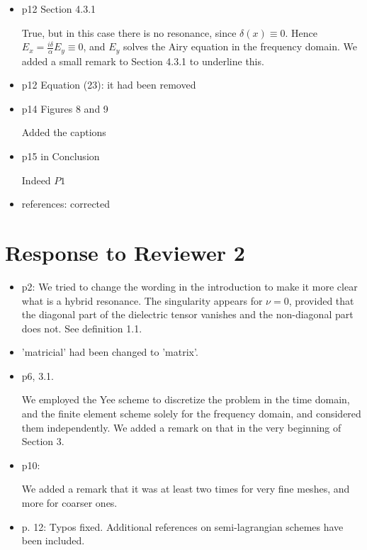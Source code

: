 \documentclass[a4paper,10pt]{article}
\begin{document}
\begin{itemize}
\item p12 Section 4.3.1

  True, but in this case there is no resonance, since $\delta(x)\equiv 0$. Hence $E_x=\frac{i\delta}{\alpha}E_y\equiv 0$, 
  and $E_y$ solves the Airy equation in the frequency domain. We added a small remark to Section 4.3.1 to underline this. 

  
\item p12 Equation (23): it had been removed
  
\item p14 Figures 8 and 9

Added the captions  


\item p15 in Conclusion

  Indeed $P1$
  
\item references: corrected
  \end{itemize}


\section{Response to  Reviewer 2}
 \begin{itemize}
\item p2:  We tried to change the wording in the introduction to make it more clear what is a hybrid resonance. 
The singularity appears for $\nu=0$, provided that the diagonal part of the dielectric tensor vanishes and the non-diagonal part does not. 
See definition 1.1.

\item 'matricial' had been changed to 'matrix'.

\item p6, 3.1. 

We employed the Yee scheme to discretize the problem in the time domain, and the finite element scheme solely for the frequency domain, 
and considered them independently. We added a remark on that in the very beginning of Section 3. 

\item p10: 

We added a remark that it was at least two times for very fine meshes, and more for coarser ones.

\item p. 12: 
Typos fixed.
Additional references on semi-lagrangian schemes have been included.

\end{itemize}

  
 
\end{document}
